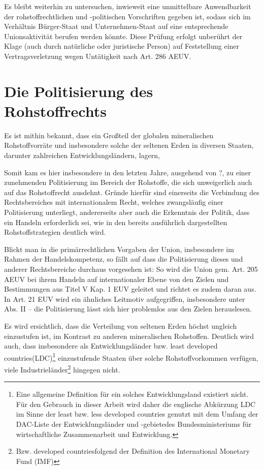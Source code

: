 \documentclass[12pt,a4paper,oneside]{book} %
\begin{document}
Es bleibt weiterhin zu untersuchen, inwieweit eine unmittelbare Anwendbarkeit der rohstoffrechtlichen und -politischen Vorschriften gegeben ist, sodass sich im Verhältnis Bürger-Staat und Unternehmen-Staat auf eine entsprechende Unionsaktivität berufen werden könnte. Diese Prüfung erfolgt unberührt der Klage (auch durch natürliche oder juristische Person) auf Feststellung einer Vertragsverletzung wegen Untätigkeit nach Art. 286 AEUV.

\section{Die Politisierung des Rohstoffrechts}

Es ist mithin bekannt, dass ein Großteil der globalen mineralischen Rohstoffvorräte und insbesondere solche der seltenen Erden in diversen Staaten, darunter zahlreichen Entwicklungsländern, lagern, 

Somit kam es hier insbesondere in den letzten Jahre, ausgehend von ?, zu einer zunehmenden Politisierung im Bereich der Rohstoffe, die sich unweigerlich auch auf das Rohstoffrecht ausdehnt. Gründe hierfür sind einerseits die Verbindung des Rechtsbereiches mit internationalem Recht, welches zwangsläufig einer Politisierung unterliegt, andererseits aber auch die Erkenntnis der Politik, dass ein Handeln erforderlich sei, wie in den bereits ausführlich dargestellten Rohstoffstrategien deutlich wird.

Blickt man in die primärrechtlichen Vorgaben der Union, insbesondere im Rahmen der Handelskompetenz, so fällt auf dass die Politisierung dieses und anderer Rechtsbereiche durchaus vorgesehen ist: So wird die Union gem. Art. 205 AEUV bei ihrem Handeln auf internationaler Ebene von den Zielen und Bestimmungen aus Titel V Kap. 1 EUV geleitet und richtet es zudem daran aus. In Art. 21 EUV wird ein ähnliches Leitmotiv aufgegriffen, insbesondere unter Abs. II -- die Politisierung lässt sich hier problemlos aus den Zielen herauslesen.



Es wird ersichtlich, dass die Verteilung von seltenen Erden höchst ungleich einzustufen ist, im Kontrast zu anderen mineralischen Rohstoffen. Deutlich wird auch, dass insbesondere als Entwicklungsländer bzw. \glqq least developed countries\grqq (LDC)\footnote{Eine allgemeine Definition für ein solches Entwicklungsland existiert nicht. Für den Gebrauch in dieser Arbeit wird daher die englische Abkürzung LDC im Sinne der least bzw. less developed countries genutzt mit dem Umfang der \glqq DAC-Liste der Entwicklungsländer und -gebiete\grqq des Bundesministeriums für wirtschaftliche Zusammenarbeit und Entwicklung.} einzustufende Staaten über solche Rohstoffvorkommen verfügen, viele Industrieländer\footnote{Bzw. \glqq developed countries\grqq folgend der Definition des International Monetary Fund (IMF)} hingegen nicht. 
\end{document}
